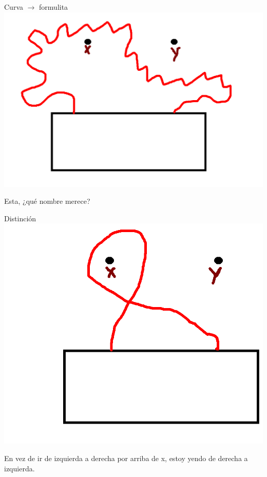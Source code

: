 \documentclass[11pt]{beamer}
\begin{document}
\begin{frame}{Curva $\rightarrow$ formulita}
	\includegraphics[scale=0.35]{images/x_v2.png}
	
	
	Esta, ¿qué nombre merece?

	
\end{frame}

\begin{frame}{Distinción}
	\includegraphics[scale=0.30]{images/x-1.png}

	En vez de ir de izquierda a derecha por arriba de x, estoy yendo de derecha a izquierda.  	\visible<2->{\color{red} \center{\Huge{$-x$}}}
	
\end{frame}
\end{document}
